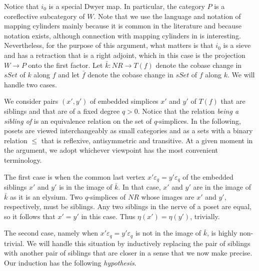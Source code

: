 Notice that $i_0$ is a special Dwyer map. In particular, the category $P$ is a coreflective subcategory of $W$. Note that we use the language and notation of mapping cylinders mainly because it is common in the literature and because notation exists, although connection with mapping cylinders in \cite[§2.4]{WJR13} is interesting. Nevertheless, for the purpose of this argument, what matters is that $i_0$ is a sieve and has a retraction that is a right adjoint, which in this case is the projection $W\to P$ onto the first factor. Let $\bar{k} :NR\to T(f)$ denote the cobase change in $sSet$ of $k$ along $f$ and let $\bar{f}$ denote the cobase change in $sSet$ of $f$ along $k$. We will handle two cases.

We consider pairs $(x',y')$ of embedded simplices $x'$ and $y'$ of $T(f)$ that are siblings and that are of a fixed degree $q>0$. Notice that the relation \emph{being a sibling of} is an equivalence relation on the set of $q$-simplices. In the following, posets are viewed interchangeably as small categories and as a sets with a binary relation $\leq $ that is reflexive, antisymmetric and transitive. At a given moment in the argument, we adopt whichever viewpoint has the most convenient terminology.

The first case is when the common last vertex $x'\varepsilon _q=y'\varepsilon _q$ of the embedded siblings $x'$ and $y'$ is in the image of $\bar{k}$. In that case, $x'$ and $y'$ are in the image of $\bar{k}$ as it is an elysium. Two $q$-simplices of $NR$ whose images are $x'$ and $y'$, respectively, must be siblings. Any two siblings in the nerve of a poset are equal, so it follows that $x'=y'$ in this case. Thus $\eta (x')=\eta (y')$, trivially.

The second case, namely when $x'\varepsilon _q=y'\varepsilon _q$ is not in the image of $\bar{k}$, is highly non-trivial. We will handle this situation by inductively replacing the pair of siblings with another pair of siblings that are closer in a sense that we now make precise. Our induction has the following \emph{hypothesis}.

